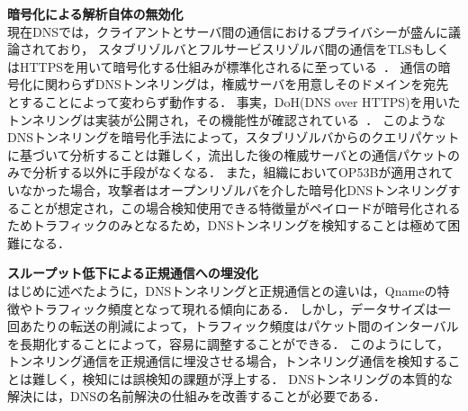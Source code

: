 \hspace{-12pt}\textbf{暗号化による解析自体の無効化}\\
\hspace{12pt}現在DNSでは，クライアントとサーバ間の通信におけるプライバシーが盛んに議論されており，
スタブリゾルバとフルサービスリゾルバ間の通信をTLSもしくはHTTPSを用いて暗号化する仕組みが標準化されるに至っている~\cite{rfc8094, rfc8484}．
通信の暗号化に関わらずDNSトンネリングは，権威サーバを用意しそのドメインを宛先とすることによって変わらず動作する．
事実，DoH(DNS over HTTPS)を用いたトンネリングは実装が公開され，その機能性が確認されている~\cite{dohtunnel, godoh, dohc2}．
このようなDNSトンネリングを暗号化手法によって，スタブリゾルバからのクエリパケットに基づいて分析することは難しく，流出した後の権威サーバとの通信パケットのみで分析する以外に手段がなくなる．
また，組織においてOP53Bが適用されていなかった場合，攻撃者はオープンリゾルバを介した暗号化DNSトンネリングすることが想定され，この場合検知使用できる特徴量がペイロードが暗号化されるためトラフィックのみとなるため，DNSトンネリングを検知することは極めて困難になる．\newline

\hspace{-12pt}\textbf{スループット低下による正規通信への埋没化}\\
\hspace{12pt}はじめに述べたように，DNSトンネリングと正規通信との違いは，Qnameの特徴やトラフィック頻度となって現れる傾向にある．
しかし，データサイズは一回あたりの転送の削減によって，トラフィック頻度はパケット間のインターバルを長期化することによって，容易に調整することができる．
このようにして，トンネリング通信を正規通信に埋没させる場合，トンネリング通信を検知することは難しく，検知には誤検知の課題が浮上する．
DNSトンネリングの本質的な解決には，DNSの名前解決の仕組みを改善することが必要である．

